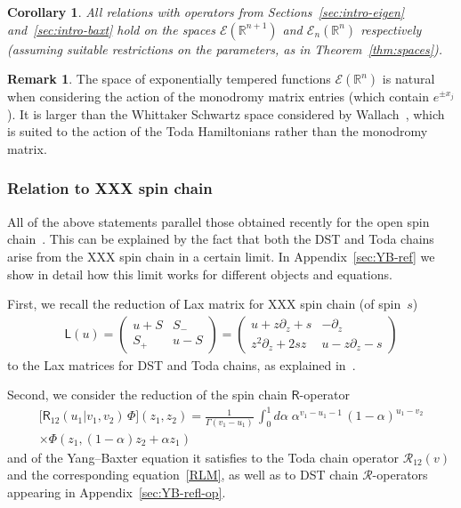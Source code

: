\documentclass[11pt]{article}
\numberwithin{equation}{section}
\theoremstyle{plain}
\newtheorem{corollary}{Corollary}
\theoremstyle{definition}
\newtheorem{remark}{Remark}
\newcommand{\R}{\mathsf{R}}
\renewcommand{\L}{\mathsf{L}}
\begin{document}
\begin{corollary}
	All relations with operators from Sections~\ref{sec:intro-eigen} and~\ref{sec:intro-baxt} hold on the spaces $\mathcal{E}(\mathbb{R}^{n+1})$ and $\mathcal{E}_n(\mathbb{R}^n)$ respectively (assuming suitable restrictions on the parameters, as in Theorem~\ref{thm:spaces}).
\end{corollary}

\begin{remark}
	The space of exponentially tempered functions $\mathcal{E}(\mathbb{R}^n)$ is natural when considering the action of the monodromy matrix entries (which contain $e^{\pm x_j}$). It is larger than the Whittaker Schwartz space considered by Wallach~\cite{W}, which is suited to the action of the Toda Hamiltonians rather than the monodromy matrix.
\end{remark}


\subsubsection{Relation to XXX spin chain}

All of the above statements parallel those obtained recently for the open spin chain~\cite{ADV2}. This can be explained by the fact that both the DST and Toda chains arise from the XXX spin chain in a certain limit. In Appendix~\ref{sec:YB-ref} we show in detail how this limit works for different objects and equations. 

First, we recall the reduction of Lax matrix for XXX spin chain (of spin~$s$)
\begin{align}
	\L(u) = \begin{pmatrix}
		u + S & S_- \\[3pt]
		S_+ & u - S
	\end{pmatrix} = 
	\begin{pmatrix}
		u + z \partial_z + s & -\partial_z \\[3pt]
		z^2 \partial_z + 2s z & u - z \partial_z - s
	\end{pmatrix}
\end{align}
to the Lax matrices for DST and Toda chains, as explained in~\cite{Skl2}. 

Second, we consider the reduction of the spin chain $\R$-operator 
\begin{multline}
	\bigl[\R_{12}(u_1|v_1,v_2) \, \Phi\bigr](z_1,z_2) = \frac{1}{\Gamma(v_1-u_1)}\,\int_{0}^1 d\alpha\; \alpha^{v_1-u_1-1} \, (1-\alpha)^{u_1-v_2} \\[0pt]
	\times \Phi(z_1,(1-\alpha)z_2+\alpha z_1)
\end{multline}
and of the Yang--Baxter equation it satisfies to the Toda chain operator $\mathcal{R}_{12}(v)$ and the corresponding equation~\eqref{RLM}, as well as to DST chain $\mathcal{R}$-operators appearing in Appendix~\ref{sec:YB-refl-op}.
\end{document}
